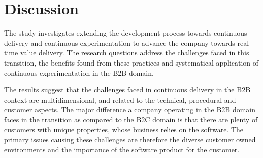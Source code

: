 \documentclass[english]{tktltiki2}
\theoremstyle{definition}
\theoremstyle{remark}
\begin{document}




\section{Discussion}

The study investigates extending the development process towards continuous delivery and continuous experimentation to advance the company towards real-time value delivery. The research questions address the challenges faced in this transition, the benefits found from these practices and systematical application of continuous experimentation in the B2B domain. 


%



The results suggest that the challenges faced in continuous delivery in the B2B context are multidimensional, and related to the technical, procedural and customer aspects. The major difference a company operating in the B2B domain faces in the transition as compared to the B2C domain is that there are plenty of customers with unique properties, whose business relies on the software. The primary issues causing these challenges are therefore the diverse customer owned environments and the importance of the software product for the customer. 
\end{document}
